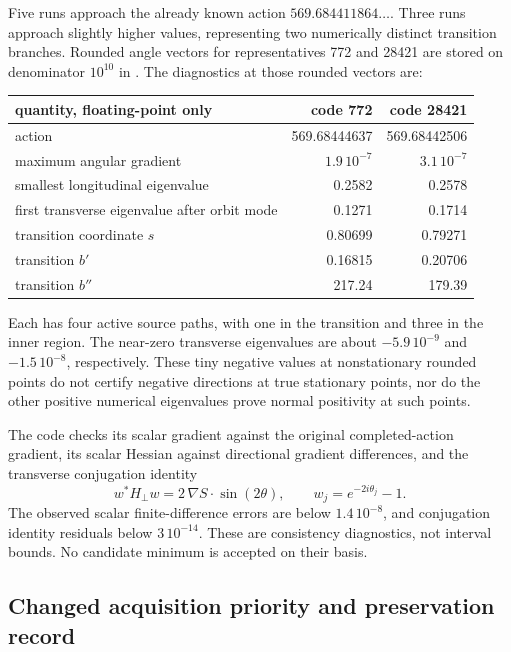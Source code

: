 \documentclass[11pt,oneside]{article}
\begin{document}
Five runs approach the already known action
\(569.684411864\ldots\). Three runs approach
slightly higher values, representing two
numerically distinct transition branches.
Rounded angle vectors for representatives
772 and 28421 are stored on denominator
\(10^{10}\) in
.
The diagnostics at those rounded vectors are:
\begin{center}\small
\begin{tabular}{lrr}
\toprule
quantity, floating-point only&code 772&code 28421\\
\midrule
action&569.68444637&569.68442506\\
maximum angular gradient&\(1.9\,10^{-7}\)&\(3.1\,10^{-7}\)\\
smallest longitudinal eigenvalue&0.2582&0.2578\\
first transverse eigenvalue after orbit mode&0.1271&0.1714\\
transition coordinate \(s\)&0.80699&0.79271\\
transition \(b'\)&0.16815&0.20706\\
transition \(b''\)&217.24&179.39\\
\bottomrule
\end{tabular}
\end{center}
Each has four active source paths, with one
in the transition and three in the inner
region. The near-zero transverse eigenvalues
are about \(-5.9\,10^{-9}\) and
\(-1.5\,10^{-8}\), respectively. These tiny
negative values at nonstationary rounded
points do not certify negative directions
at true stationary points, nor do the other
positive numerical eigenvalues prove normal
positivity at such points.

The code
checks its scalar gradient against the
original completed-action gradient, its
scalar Hessian against directional gradient
differences, and the transverse conjugation
identity
\[
 w^*H_\perp w=2\,\nabla S\cdot\sin(2\theta),
 \qquad w_j=e^{-2i\theta_j}-1 .
\]
The observed scalar finite-difference errors
are below \(1.4\,10^{-8}\), and conjugation
identity residuals below \(3\,10^{-14}\).
These are consistency diagnostics, not
interval bounds. No candidate minimum is
accepted on their basis.

\subsection{Changed acquisition priority and preservation record}
\end{document}
